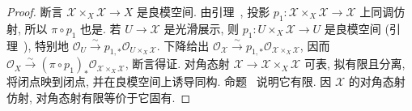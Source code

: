 \begin{proof}
断言 $\mathcal X\times_X\mathcal X\to X$ 是良模空间. 由引理~, 投影 $p_1:\mathcal X\times_X\mathcal X\to\mathcal X$ 上同调仿射, 所以 $\pi\circ p_1$ 也是. 若 $U\to\mathcal X$ 是光滑展示, 则 $p_1:U\times_X\mathcal X\to U$ 是良模空间 (引理~), 特别地 $\mathcal O_U\xrightarrow{\sim}p_{1,*}\mathcal O_{U\times_X\mathcal X}$. 下降给出 $\mathcal O_{\mathcal X}\xrightarrow{\sim}p_{1,*}\mathcal O_{\mathcal X\times_X\mathcal X}$, 因而 $\mathcal O_X\xrightarrow{\sim}(\pi\circ p_1)_*\mathcal O_{\mathcal X\times_X\mathcal X}$, 断言得证. 对角态射 $\mathcal X\to\mathcal X\times_X\mathcal X$ 可表, 拟有限且分离, 将闭点映到闭点, 并在良模空间上诱导同构. 命题~ 说明它有限. 因 $\mathcal X$ 的对角态射仿射, 对角态射有限等价于它固有.
\end{proof}

